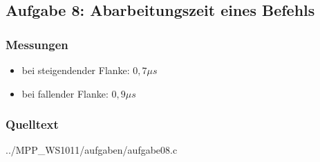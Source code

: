\subsection*{Aufgabe 8: Abarbeitungszeit eines Befehls}

\subsubsection*{Messungen}
\begin{itemize}
    \item bei steigendender Flanke: $0,7 \mu s$
    \item bei fallender Flanke: $0,9 \mu s$
\end{itemize}

\subsubsection*{Quelltext}


{../MPP_WS1011/aufgaben/aufgabe08.c}
